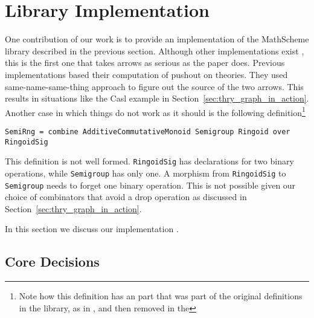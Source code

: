\section{Library Implementation}
\label{sec:lib_implementation}
One contribution of our work is to provide an implementation of the MathScheme library described in the previous section. Although other implementations exist , this is the first one that takes arrows as serious as the paper does. Previous implementations based their computation of pushout on theories. They used same-name-same-thing approach to figure out the source of the two arrows. This results in situations like the Casl example in Section~\ref{sec:thry_graph_in_action}. Another case in which things do not work as it should is the following definition\footnote{Note how this definition has an  part that was part of the original definitions in the library, as in \cite{CaretteOConnorTPC}, and then removed in the }
\begin{lstlisting}
SemiRng = combine AdditiveCommutativeMonoid Semigroup Ringoid over RingoidSig
\end{lstlisting}
This definition is not well formed. \verb|RingoidSig| has declarations for two binary operations, while \verb|Semigroup| has only one. A morphism from \verb|RingoidSig| to \verb|Semigroup| needs to forget one binary operation. This is not possible given our choice of combinators that avoid a drop operation as discussed in Section~\ref{sec:thry_graph_in_action}. 

In this section we discuss our implementation . 

\subsection{Core Decisions}


